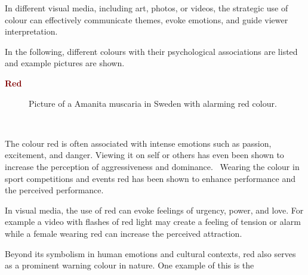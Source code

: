\documentclass[../MasterThesis.tex]{subfiles}
\begin{document}
In different visual media, including art, photos, or videos, the strategic use of colour can effectively communicate themes, evoke emotions, and guide viewer interpretation.~\cite{cc_cg_1, cc_cg_2, colour, colour2}


In the following, different colours with their psychological associations are listed and example pictures are shown.



\textbf{\textcolor{Maroon}{Red}}

%
%

\begin{minipage}{0.5\textwidth}
	\begin{figure}[H]
		\begin{center}
			\caption[Picture of a Amanita muscaria in Sweden with alarming red colour.]{Picture of a Amanita muscaria in Sweden with alarming red colour.}
			\label{figure:red}
		\end{center}
	\end{figure}
 \hfill
\end{minipage}\begin{minipage}{0.05\textwidth}
	\ 
\end{minipage}\begin{minipage}{0.45\textwidth}
	The colour red is often associated with intense emotions such as passion, excitement, and danger. Viewing it on self or others has even been shown to increase the perception of aggressiveness and dominance.~\cite{red_dominance} Wearing the colour in sport competitions and events red has been shown to enhance performance and the perceived performance.~\cite{colour, red_sport}
	
	In visual media, the use of red can evoke feelings of urgency, power, and love. For example a video with flashes of red light may create a feeling of tension or alarm while a female wearing red can increase the perceived attraction.~\cite{colour, red_romance}
	
	Beyond its symbolism in human emotions and cultural contexts, red also serves as a prominent warning colour in nature. One example of this is the
	
\end{minipage}
\end{document}
